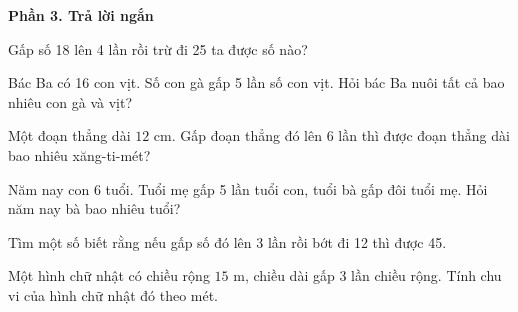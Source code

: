 \textbf{Phần 3. Trả lời ngắn}

\begin{ex} %
Gấp số 18 lên 4 lần rồi trừ đi 25 ta được số nào?
\end{ex}

\begin{ex} %
Bác Ba có 16 con vịt. Số con gà gấp 5 lần số con vịt. Hỏi bác Ba nuôi tất cả bao nhiêu con gà và vịt?
\end{ex}

\begin{ex} %
Một đoạn thẳng dài $12\text{ cm}$. Gấp đoạn thẳng đó lên 6 lần thì được đoạn thẳng dài bao nhiêu xăng-ti-mét?
\end{ex}

\begin{ex} %
Năm nay con 6 tuổi. Tuổi mẹ gấp 5 lần tuổi con, tuổi bà gấp đôi tuổi mẹ. Hỏi năm nay bà bao nhiêu tuổi?
\end{ex}

\begin{ex} %
Tìm một số biết rằng nếu gấp số đó lên 3 lần rồi bớt đi 12 thì được 45.
\end{ex}

\begin{ex} %
Một hình chữ nhật có chiều rộng $15\text{ m}$, chiều dài gấp 3 lần chiều rộng. Tính chu vi của hình chữ nhật đó theo mét.
\end{ex}

